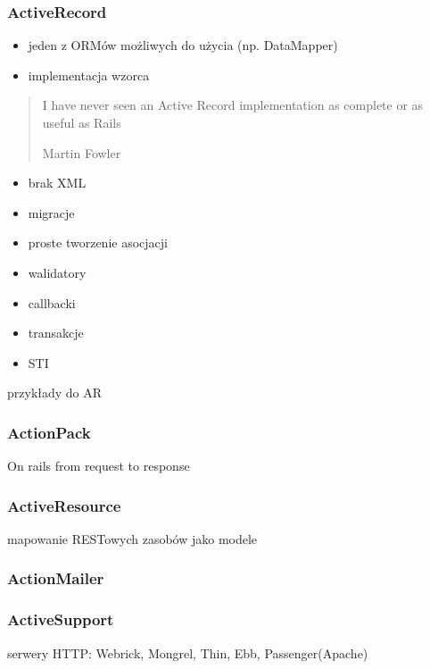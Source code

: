 \documentclass[12t]{beamer}
\begin{document}
\begin{frame}
  \frametitle{ActiveRecord}
  \begin{itemize}
  \item jeden z ORMów możliwych do użycia (np. DataMapper)
  \item implementacja wzorca
  \end{itemize}
\end{frame}

\begin{frame}
  \begin{quote}
    I have never seen an Active Record implementation as complete or as useful as Rails

    \hfill Martin Fowler
  \end{quote}
\end{frame}

\begin{frame}
  \begin{itemize}
  \item brak XML
  \item migracje
  \item proste tworzenie asocjacji
  \item walidatory
  \item callbacki
  \item transakcje
  \item STI
  \end{itemize}
\end{frame}

\begin{frame}
  przykłady do AR
\end{frame}

\begin{frame}
  \frametitle{ActionPack}
  On rails from request to response
\end{frame}

\begin{frame}
  \frametitle{ActiveResource}
  mapowanie RESTowych zasobów jako modele
\end{frame}

\begin{frame}
  \frametitle{ActionMailer}
\end{frame}

\begin{frame}
  \frametitle{ActiveSupport}
\end{frame}

\begin{frame}
  serwery HTTP: Webrick, Mongrel, Thin, Ebb, Passenger(Apache)
\end{frame}
\end{document}
